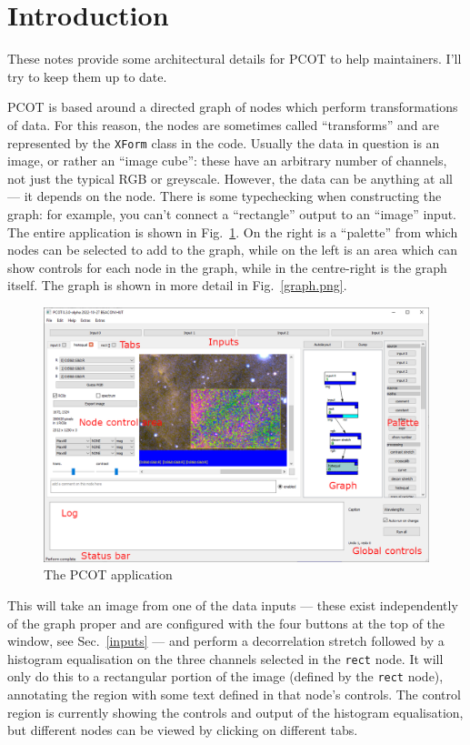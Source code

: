 

\section{Introduction}
These notes provide some architectural details for PCOT to help
maintainers. I'll try to keep them up to date.

PCOT is based around a directed graph of nodes which perform
transformations of data. For this reason, the nodes are sometimes
called ``transforms'' and are represented by the \texttt{XForm} class
in the code.
Usually the data in question is an image, or rather an ``image cube'':
these have an arbitrary number of channels, not just the typical
RGB or greyscale. However, the data can be anything at all --- it depends
on the node. There is some typechecking when constructing the graph:
for example, you can't connect a ``rectangle'' output to an ``image'' input.
The entire application is shown in Fig.~\ref{app.png}. On the right
is a ``palette'' from which nodes can be selected to add to the graph,
while on the left
is an area which can show controls for each node in the graph, while
in the centre-right is the graph itself. The graph is shown in more detail
in Fig.~\ref{graph.png}.

\begin{figure}[ht]
\center
\includegraphics[width=6in]{app.png}
\caption{The PCOT application}
\label{app.png}
\end{figure}

\clearpage This will take an image from one of the data inputs --- these
exist independently of the graph proper and are configured with the four buttons
at the top of the window, see Sec.~\ref{inputs} ---
and perform a decorrelation stretch followed by a histogram
equalisation on the three channels selected in the \texttt{rect} node.
It will only do this to a rectangular
portion of the image (defined by the \texttt{rect} node), annotating the
region with some text defined in that node's controls. The
control region is currently showing the controls and 
output of the histogram equalisation,
but different nodes can be viewed by clicking on different tabs.

